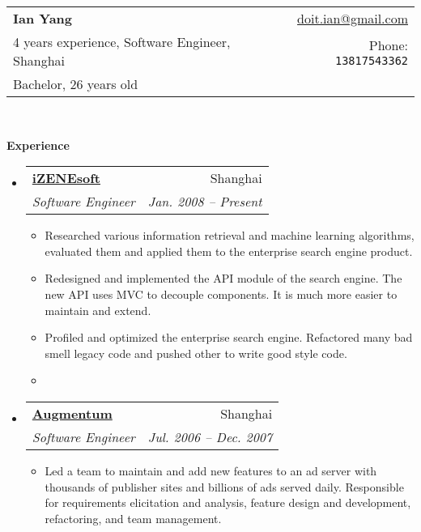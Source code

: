 \documentclass[letterpaper,11pt]{article}
\makeatletter
\newcommand{\resitem}[1]{\item #1 \vspace{-2pt}}
\newcommand{\resheading}[1]{{\large \colorbox{mygrey}{\begin{minipage}{\textwidth}{\textbf{#1 \vphantom{p\^{E}}}}\end{minipage}}}}
\newcommand{\ressubheading}[4]{
\begin{tabular*}{6.5in}{l@{\extracolsep{\fill}}r}
  \textbf{#1} & #2 \\
  \textit{#3} & \textit{#4} \\
\end{tabular*}\vspace{-6pt}}
\makeatother
\begin{document}
\newcommand{\mywebheader}{
\begin{tabular*}{7in}{l@{\extracolsep{\fill}}r}
  \textbf{\LARGE Ian Yang} & \href{mailto:doit.ian@gmail.com}{doit.ian@gmail.com} \\
    {\small 4 years experience, Software Engineer, Shanghai} & {\small Phone: \texttt{13817543362}} \\
    {\footnotesize Bachelor, 26 years old} & \\
  \end{tabular*}
\\
\vspace{0.1in}}

\mywebheader

\resheading{Experience}

\begin{itemize}
\item
  \ressubheading{\href{http://www.izenesoft.com/EN/home.html}{iZENEsoft}}{Shanghai}{%
    Software Engineer}{Jan. 2008 -- Present}

  { \footnotesize
    \begin{itemize}
      \resitem{Researched various information retrieval and machine learning
        algorithms, evaluated them and applied them to the enterprise search
        engine product.}
      
      \resitem{Redesigned and implemented the API module of the search
        engine. The new API uses MVC to decouple components. It is much more
        easier to maintain and extend.}

      \resitem{Profiled and optimized the enterprise search engine. Refactored
        many bad smell legacy code and pushed other to write good style code.}

      \resitem{
        
      }

      
    \end{itemize}
  }

\item \ressubheading{\href{http://www.augmentum.com/}{Augmentum}}{Shanghai}{%
      Software Engineer}{Jul. 2006 -- Dec. 2007}

  { \footnotesize
    \begin{itemize}
      \resitem{Led a team to maintain and add new features to an ad server with
        thousands of publisher sites and billions of ads served
        daily. Responsible for requirements elicitation and analysis, feature
        design and development, refactoring, and team management.}
      

\end{itemize}}
\end{itemize}
\end{document}

